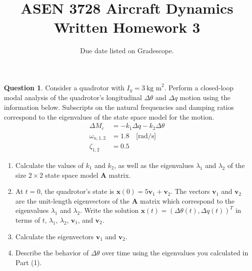 \documentclass{article}
\title{ASEN 3728 Aircraft Dynamics\\Written Homework 3}
\date{Due date listed on Gradescope.}
\theoremstyle{definition}
\newtheorem{question}{Question}
\begin{document}
\maketitle

\begin{question}

Consider a quadrotor with $I_y=3\ \text{kg m}^2$. Perform a closed-loop modal analysis of the quadrotor's longitudinal $\Delta \theta$ and $\Delta q$ motion using the information below. Subscripts on the natural frequencies and damping ratios correspond to the eigenvalues of the state space model for the motion.
\begin{align*}
    \Delta M_c &= -k_1 \Delta q - k_2 \Delta \theta \\
    \omega_{n,1,2} &= 1.8 \quad \text{[rad/s]} \\
    \zeta_{1,2} &= 0.5
\end{align*}

\begin{enumerate}
    \item Calculate the values of $k_1$ and $k_2$, as well as the eigenvalues $\lambda_1$ and $\lambda_2$ of the size $2\times2$ state space model $\mathbf{A}$ matrix.
    \item At $t=0$, the quadrotor's state is $\mathbf{x}(0) = 5\mathbf{v}_1 + \mathbf{v}_2$. The vectors $\mathbf{v}_1$ and $\mathbf{v}_2$ are the unit-length eigenvectors of the $\mathbf{A}$ matrix which correspond to the eigenvalues $\lambda_1$ and $\lambda_2$. Write the solution $\mathbf{x}(t)=(\Delta \theta(t),\Delta q(t))^T$ in terms of $t$, $\lambda_1$, $\lambda_2$, $\mathbf{v}_1$, and $\mathbf{v}_2$. 
    \item Calculate the eigenvectors $\mathbf{v}_1$ and $\mathbf{v}_2$.
    \item Describe the behavior of $\Delta \theta$ over time using the eigenvalues you calculated in Part (1).
\end{enumerate}
\end{question}

\vspace{0.1cm}

\clearpage
\end{document}
